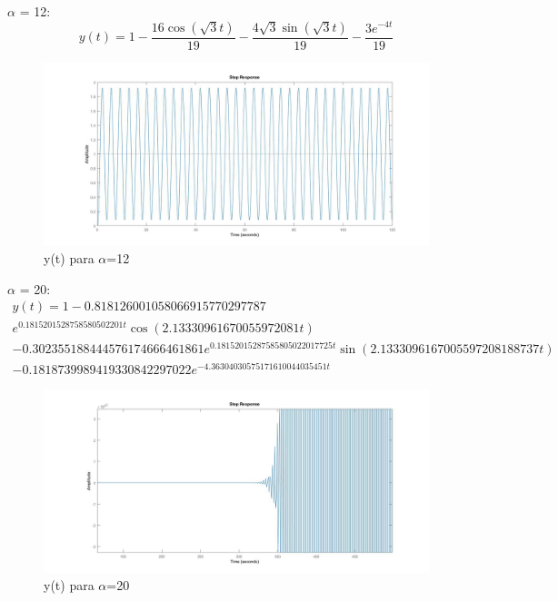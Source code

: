 \documentclass[a4paper,12pt,twoside]{article}
\begin{document}
 $\alpha$ = 12:
\begin{equation*}
y(t) = 1 -\frac{16\cos(\sqrt{3}t) }{19} -\frac{4\sqrt{3}\sin(\sqrt{3}t)}{19}-\frac{3e^{-4t}}{19}
\end{equation*}

\begin{figure}[H]
\centering
\includegraphics[scale=0.3]{a=12.jpg}
\caption{y(t) para $\alpha$=12}
\label{fig:a=12}
\end{figure}

$\alpha$ = 20:
\begin{equation*}
\begin{split}
y(t) = 1-0.818126001058066915770297787\\
e^{0.1815201528758580502201t}\cos(2.13330961670055972081t)\\
-0.302355188444576174666461861e^{0.18152015287585805022017725t}\sin(2.1333096167005597208188737t) \\
-0.1818739989419330842297022e^{ -4.36304030575171610044035451t}
\end{split}
\end{equation*}

\begin{figure}[H]
\centering
\includegraphics[scale=0.3]{a=20.jpg}
\caption{y(t) para $\alpha$=20}
\label{fig:a=20}
\end{figure}
\end{document}
